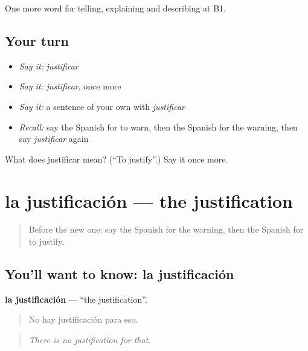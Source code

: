 \begin{grammarlens}[title={What you've built}]
One more word for telling, explaining and describing at B1.
\end{grammarlens}

\subsection*{Your turn}
\begin{itemize}
\raggedright
  \item \emph{Say it:} \emph{justificar}
  \item \emph{Say it:} \emph{justificar}, once more
  \item \emph{Say it:} a sentence of your own with \emph{justificar}
  \item \emph{Recall:} say the Spanish for to warn, then the Spanish for the warning, then say \emph{justificar} again
\end{itemize}

\begin{tcolorbox}[breakable,colback=teal!4,colframe=teal!35!black,title={Before you move on}]
What does justificar mean? (\textquotedblleft{}To justify\textquotedblright{}.) Say it once more.
\end{tcolorbox}
\section[la justificación]{la justificación — the justification}

\label{lesson:ES-C586-justificacion}



\begin{quote}
Before the new one: say the Spanish for the warning, then the Spanish for to justify.
\end{quote}

\subsection*{You'll want to know: la justificación}
\textbf{la justificación} — \textquotedblleft{}the justification\textquotedblright{}.

\begin{quote}
No hay justificación para eso.
\end{quote}

\begin{quote}
\emph{There is no justification for that.}
\end{quote}

